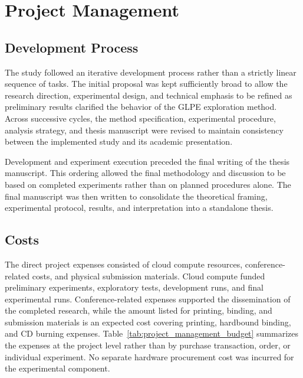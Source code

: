 \section{Project Management}
\label{sec:methodology_project_management}

\subsection{Development Process}
\label{subsec:methodology_development_process}

The study followed an iterative development process rather than a strictly linear sequence of tasks.
The initial proposal was kept sufficiently broad to allow the research direction, experimental design, and technical emphasis to be refined as preliminary results clarified the behavior of the GLPE exploration method.
Across successive cycles, the method specification, experimental procedure, analysis strategy, and thesis manuscript were revised to maintain consistency between the implemented study and its academic presentation.

Development and experiment execution preceded the final writing of the thesis manuscript.
This ordering allowed the final methodology and discussion to be based on completed experiments rather than on planned procedures alone.
The final manuscript was then written to consolidate the theoretical framing, experimental protocol, results, and interpretation into a standalone thesis.

\subsection{Costs}
\label{subsec:methodology_costs}

The direct project expenses consisted of cloud compute resources, conference-related costs, and physical submission materials.
Cloud compute funded preliminary experiments, exploratory tests, development runs, and final experimental runs.
Conference-related expenses supported the dissemination of the completed research, while the amount listed for printing, binding, and submission materials is an expected cost covering printing, hardbound binding, and CD burning expenses.
Table~\ref{tab:project_management_budget} summarizes the expenses at the project level rather than by purchase transaction, order, or individual experiment.
No separate hardware procurement cost was incurred for the experimental component.

